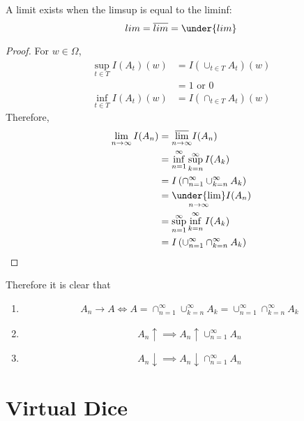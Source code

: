 \documentclass[11pt]{article}
\numberwithin{equation}{section}
\begin{document}
\proposition A limit exists when the limsup is equal to the liminf:
\begin{equation}
	lim = \overline{lim} = \under{lim}
\end{equation}
\begin{proof}
For $w \in \Omega$,
	\begin{align*}
		\sup_{t \in T} I(A_t)(w) &= I(\cup_{t\in T} A_t)(w) \\
		&= 1 \text{ or } 0 \\
		\inf_{t \in T} I(A_t)(w) &= I(\cap_{t\in T} A_t)(w)
	\end{align*}
Therefore,
\begin{align*}
	\lim_{n \rightarrow \infty} I(A_n) &= \underset{n \rightarrow \infty}{\overline{\lim}} I(A_n) \\
	&= \inf_{n=1}^\infty \sup_{k=n}^\infty I(A_k) \\
	&= I\left(\cap_{n=1}^\infty \cup_{k=n}^\infty A_k \right) \\
	&= \underset{n \rightarrow \infty}{\under{\lim}} I(A_n) \\
	&= \sup_{n=1}^\infty \inf_{k=n}^\infty I(A_k) \\
	&= I\left(\cup_{n=1}^\infty \cap_{k=n}^\infty A_k \right)
\end{align*}
\end{proof}
\property Therefore it is clear that
\begin{enumerate}
	\item \begin{align}
	A_n \rightarrow A \iff A = \cap_{n=1}^\infty \cup_{k=n}^\infty A_k = \cup_{n=1}^\infty \cap_{k=n}^\infty A_k
\end{align}
	\item 
	\begin{equation} \label{monotone sequence limit 1}
		A_n \uparrow \implies A_n \uparrow \cup_{n=1}^\infty A_n
	\end{equation}
	\item
	\begin{equation} \label{monotone sequence limit 2}
		A_n \downarrow \implies A_n \downarrow \cap_{n=1}^\infty A_n
	\end{equation}

\end{enumerate}

\section{Virtual Dice}
\end{document}

